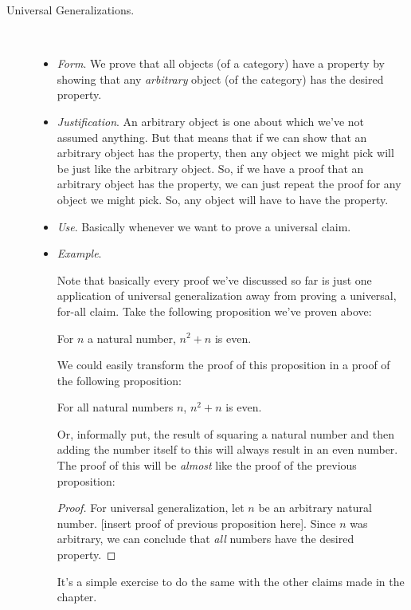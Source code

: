 \begin{enumerate}[{\thesection}.1]
\begin{description}
			\item[Universal Generalizations.] \
			
			
			\begin{itemize}
			
					\item \emph{Form}. 	We prove that all objects (of a category) have a property by showing that any \emph{arbitrary} object (of the category) has the desired property.
				
					\item \emph{Justification}. An arbitrary object is one about which we've not assumed anything. But that means that if we can show that an arbitrary object has the property, then any object we might pick will be just like the arbitrary object. So, if we have a proof that an arbitrary object has the property, we can just repeat the proof for any object we might pick. So, any object will have to have the property.
										
					\item \emph{Use}. Basically whenever we want to prove a universal claim.
					
					\item \emph{Example}.
					
					Note that basically every proof we've discussed so far is just one application of universal generalization away from proving a universal, for-all claim.
					Take the following proposition we've proven above:
					\begin{proposition}
					For $n$ a natural number, $n^2+n$ is even. 
					\end{proposition}
			
					We could easily transform the proof of this proposition in a proof of the following proposition:
					\begin{proposition}
					For all natural numbers $n$, $n^2+n$ is even.
					\end{proposition}
					Or, informally put, the result of squaring a natural number and then adding the number itself to this will always result in an even number. The proof of this will be \emph{almost} like the proof of the previous proposition:
					\begin{proof}
					For universal generalization, let $n$ be an arbitrary natural number. [insert proof of previous proposition here]. Since $n$ was arbitrary, we can conclude that \emph{all} numbers have the desired property.
					\end{proof}		
					It's a simple exercise to do the same with the other claims made in the chapter.
						

\end{itemize}
\end{description}
\end{enumerate}
